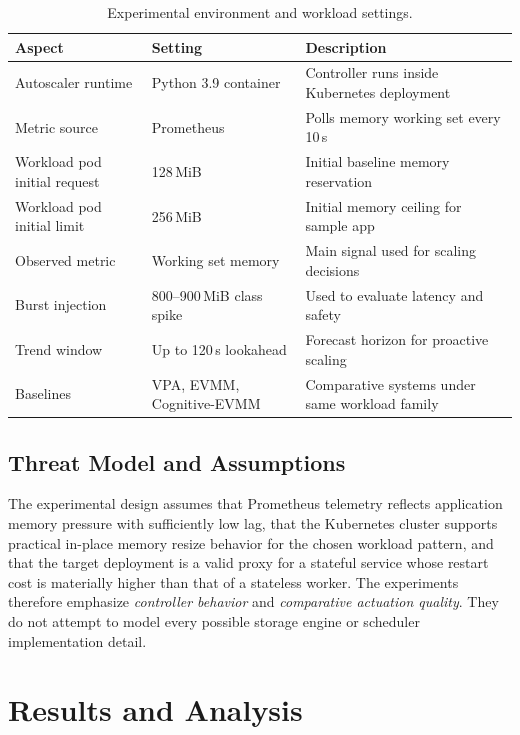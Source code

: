 \documentclass[12pt,a4paper]{article}
\begin{document}
\begin{table}[t]
\centering
\caption{Experimental environment and workload settings.}
\label{tab:experimental_setup}
\begin{tabularx}{\textwidth}{L{4cm}L{3cm}Y}
\toprule
\textbf{Aspect} & \textbf{Setting} & \textbf{Description} \\
\midrule
Autoscaler runtime & Python 3.9 container & Controller runs inside Kubernetes deployment \\
Metric source & Prometheus & Polls memory working set every 10\,s \\
Workload pod initial request & 128\,MiB & Initial baseline memory reservation \\
Workload pod initial limit & 256\,MiB & Initial memory ceiling for sample app \\
Observed metric & Working set memory & Main signal used for scaling decisions \\
Burst injection & 800--900\,MiB class spike & Used to evaluate latency and safety \\
Trend window & Up to 120\,s lookahead & Forecast horizon for proactive scaling \\
Baselines & VPA, EVMM, Cognitive-EVMM & Comparative systems under same workload family \\
\bottomrule
\end{tabularx}
\end{table}

\subsection{Threat Model and Assumptions}

The experimental design assumes that Prometheus telemetry reflects application memory pressure with sufficiently low lag, that the Kubernetes cluster supports practical in-place memory resize behavior for the chosen workload pattern, and that the target deployment is a valid proxy for a stateful service whose restart cost is materially higher than that of a stateless worker. The experiments therefore emphasize \emph{controller behavior} and \emph{comparative actuation quality}. They do not attempt to model every possible storage engine or scheduler implementation detail.

\section{Results and Analysis}
\label{sec:results}
\end{document}
